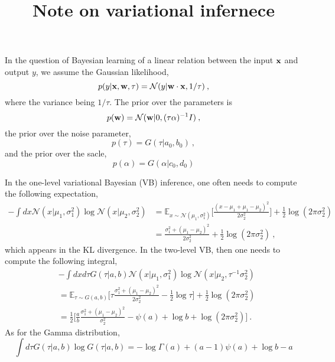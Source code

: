\documentclass[letter,11pt]{article}
\title{Note on variational infernece}
\begin{document}
\maketitle

In the question of Bayesian learning of a linear relation between the input ${\bf x}$ and output $y$, we assume the Gaussian likelihood,
\begin{equation}
	p(y|{\bf x}, {\bf w}, \tau)=\mathcal N(y|{\bf w}\cdot{\bf x},1/\tau)\:,
\end{equation} where the variance being $1/\tau$. The prior over the parameters is
\begin{equation}
	p({\bf w}) = \mathcal N({\bf w}|0, (\tau\alpha)^{-1}I)\:,
\end{equation} the prior over the noise parameter, 
\begin{equation}
	p(\tau)=G(\tau|a_0,b_0)\:,
\end{equation} and the prior over the sacle,
\begin{equation}
	p(\alpha)=G(\alpha|c_0,d_0)
\end{equation}

In the one-level variational Bayesian (VB) inference, one often needs to compute the following expectation, 
\begin{equation}
\begin{split}
	-\int dx \mathcal N(x|\mu_1,\sigma_1^2)\log \mathcal N(x|\mu_2,\sigma_2^2) 
	&= \mathbb E_{x\sim\mathcal N(\mu_1,\sigma_1^2)}
	\big[
	\frac{(x-\mu_1+\mu_1-\mu_2)^2}{2\sigma_2^2}
	\big] 
	+\frac{1}{2}\log(2\pi\sigma_2^2) \\
	&= %
	\frac{\sigma_1^2+(\mu_1-\mu_2)^2}{2\sigma_2^2} + \frac{1}{2}\log(2\pi\sigma_2^2)\:,
\end{split}
\end{equation} which appears in the KL divergence. In the two-level VB, then one needs to compute the following integral,
\begin{equation}
\begin{split}
	&-\int dxd\tau G(\tau|a,b)\mathcal N(x|\mu_1,\sigma_1^2)\log \mathcal N(x|\mu_2,\tau^{-1}\sigma_2^2) \\
	&= \mathbb E_{\tau\sim G(a,b)}
	\big[
	\tau\frac{\sigma_1^2+(\mu_1-\mu_2)^2}{2\sigma_2^2} - \frac{1}{2}\log\tau
	\big] + \frac{1}{2}\log(2\pi\sigma_2^2)\\
	&= \frac{1}{2}\bigg[
	\frac{a}{b}\frac{\sigma_1^2+(\mu_1-\mu_2)^2}{\sigma_2^2} 
	-\psi(a) +\log b
	+ \log(2\pi\sigma_2^2)
	\bigg]\:.
\end{split}
\end{equation} As for the Gamma distribution,
\begin{equation}
	\int d\tau G(\tau|a,b)\log G(\tau|a,b) = -\log\Gamma(a) + (a-1)\psi(a) + \log b - a
\end{equation}
\end{document}
